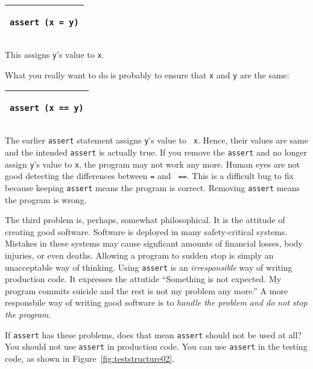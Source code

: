 \noindent
\begin{tabular}{|p{5in}|}\hline
\begin{verbatim}
assert (x = y)
\end{verbatim}
\\ \hline
\end{tabular}
\vspace{0.2in}

This assigns {\tt y}'s value to {\tt x}.

What you really want to do is probably to ensure that  {\tt x} and {\tt y}
are the same:

\vspace{0.2in}

\noindent
\begin{tabular}{|p{5in}|}\hline
\begin{verbatim}
assert (x == y)
\end{verbatim}
\\ \hline
\end{tabular}
\vspace{0.2in}

The earlier {\tt assert} statement assigns {\tt y}'s value to {\tt
  x}. Hence, their values are same and the intended {\tt assert} is
actually true.  If you remove the {\tt assert} and no longer assign
{\tt y}'s value to {\tt x}, the program may not work any more. Human
eyes are not good detecting the differences between {\tt =} and {\tt
  ==}. This is a difficult bug to fix because keeping {\tt assert}
means the program is correct. Removing {\tt assert} means the program
is wrong.



The third problem is, perhaps, somewhat philosophical.  It is the
attitude of creating good software.  Software is deployed in many
safety-critical systems. Mistakes in these systems may cause
signficant amounts of financial losses, body injuries, or even deaths.
Allowing a program to sudden stop is simply an unacceptable way of
thinking.  Using {\tt assert} is an {\it irresponsible} way of writing
production code.  It expresses the attutide ``Something is not
expected. My program commits suicide and the rest is not my problem
any more.''  A more responsbile way of writing good software is to
{\it handle the problem and do not stop the program}.

If {\tt assert} has these problems, does that mean {\tt assert} should
not be used at all?  You should not use {\tt assert} in production
code.  You can use {\tt assert} in the testing code, as shown in
Figure~\ref{fig:teststructure02}.


